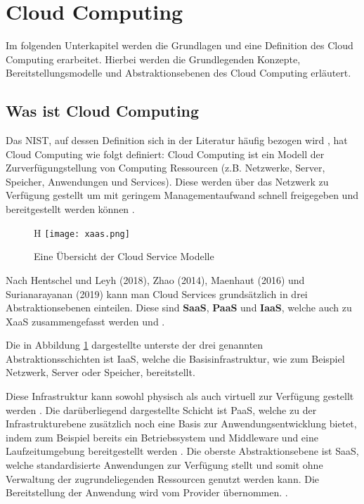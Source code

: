 \section{Cloud Computing}

Im folgenden Unterkapitel werden die Grundlagen und eine Definition des Cloud Computing erarbeitet. Hierbei werden die Grundlegenden Konzepte, Bereitstellungsmodelle und Abstraktionsebenen des Cloud Computing erläutert.

\subsection{Was ist Cloud Computing}

Das \ac{NIST}, auf dessen Definition sich in der Literatur häufig bezogen wird \cite[Vgl.][S. 4f]{Reinheimer2018}, hat Cloud Computing wie folgt definiert: Cloud Computing ist ein Modell der Zurverfügungstellung von Computing Ressourcen (z.B. Netzwerke, Server, Speicher, Anwendungen und Services). Diese werden über das Netzwerk zu Verfügung gestellt um mit geringem Managementaufwand schnell freigegeben und bereitgestellt werden können \cite[Vgl.][S. 2]{Mell2011}\cite[Vgl.][S. 5]{Reinheimer2018}.

\begin{figure}{H}
    \centering
    \texttt{[image: xaas.png]}
    \caption{Eine Übersicht der Cloud Service Modelle \cite[Eigene Darstellung nach][S. 33]{Maenhaut2016}\cite[Ergänzt durch][]{Toroman2018}}
    \label{fig:XaaS}
\end{figure}

Nach Hentschel und Leyh (2018), Zhao (2014), Maenhaut (2016) und Surianarayanan (2019) kann man Cloud Services grundsätzlich in drei Abstraktionsebenen einteilen. Diese sind \textbf{\ac{SaaS}}, \textbf{\ac{PaaS}} und \textbf{\ac{IaaS}}, welche auch zu \ac{XaaS} zusammengefasst werden \cite[Vgl.][S. 9]{Reinheimer2018}\cite[Vgl.][S. 143f]{Zhao2014}\cite[Vgl.][S. 32ff]{Maenhaut2016} und \cite[Vgl.][S. 226ff]{Surianarayanan2019}.


Die in Abbildung \ref{fig:XaaS} dargestellte unterste der drei genannten Abstraktionsschichten ist \ac{IaaS}, welche die Basisinfrastruktur, wie zum Beispiel Netzwerk, Server oder Speicher, bereitstellt.

Diese Infrastruktur kann sowohl physisch als auch virtuell zur Verfügung gestellt werden \cite[Vgl.][S. 9f]{Reinheimer2018}. Die darüberliegend dargestellte Schicht ist \ac{PaaS}, welche zu der Infrastrukturebene zusätzlich noch eine Basis zur Anwendungsentwicklung bietet, indem zum Beispiel bereits ein Betriebssystem und Middleware und eine Laufzeitumgebung bereitgestellt werden \cite[Vgl.][S. 10]{Reinheimer2018}. Die oberste Abstraktionsebene ist \ac{SaaS}, welche standardisierte Anwendungen zur Verfügung stellt und somit ohne Verwaltung der zugrundeliegenden Ressourcen genutzt werden kann. Die Bereitstellung der Anwendung wird vom Provider übernommen.
\cite[Vgl.][S. 11]{Reinheimer2018}.

